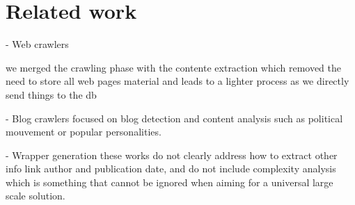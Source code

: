 \section{Related work}

- Web crawlers

we merged the crawling phase with the contente extraction which removed the need to store all web pages material and leads to a lighter process as we directly send things to the db

- Blog crawlers
focused on blog detection and content analysis such as political mouvement or popular personalities.


- Wrapper generation
these works do not clearly address how to extract other info link author and publication date, and do not include complexity analysis which is something that cannot be ignored when aiming for a universal large scale solution.





